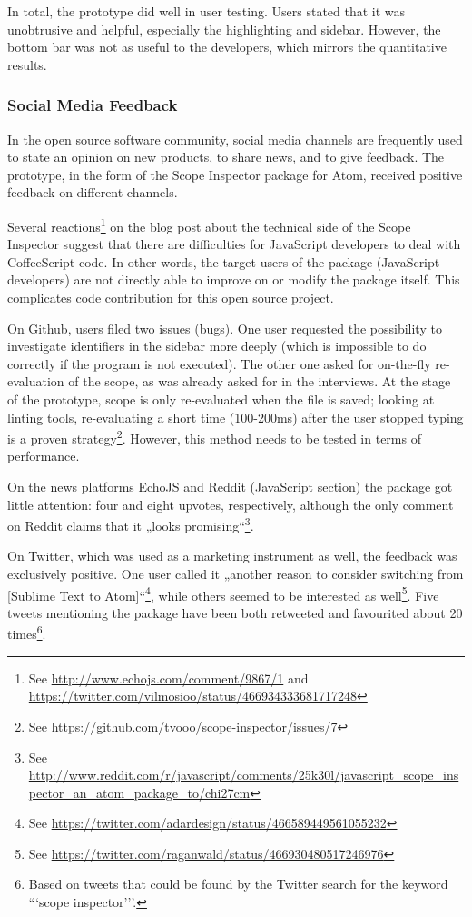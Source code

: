 In total, the prototype did well in user testing. Users stated that it
was unobtrusive and helpful, especially the highlighting and sidebar.
However, the bottom bar was not as useful to the developers, which
mirrors the quantitative results.

\subsubsection{Social Media Feedback}\label{social-media-feedback}

In the open source software community, social media channels are
frequently used to state an opinion on new products, to share news, and
to give feedback. The prototype, in the form of the Scope Inspector
package for Atom, received positive feedback on different channels.

Several
reactions\footnote{See \url{http://www.echojs.com/comment/9867/1} and \url{https://twitter.com/vilmosioo/status/466934333681717248}}
on the blog post about the technical side of the Scope Inspector
\cite{tvo} suggest that there are difficulties for JavaScript developers
to deal with CoffeeScript code. In other words, the target users of the
package (JavaScript developers) are not directly able to improve on or
modify the package itself. This complicates code contribution for this
open source project.

On Github, users filed two issues (bugs). One user requested the
possibility to investigate identifiers in the sidebar more deeply (which
is impossible to do correctly if the program is not executed). The other
one asked for on-the-fly re-evaluation of the scope, as was already
asked for in the interviews. At the stage of the prototype, scope is
only re-evaluated when the file is saved; looking at linting tools,
re-evaluating a short time (100-200ms) after the user stopped typing is
a proven
strategy\footnote{See \url{https://github.com/tvooo/scope-inspector/issues/7}}.
However, this method needs to be tested in terms of performance.

On the news platforms EchoJS and Reddit (JavaScript section) the package
got little attention: four and eight upvotes, respectively, although the
only comment on Reddit claims that it „looks
promising“\footnote{See \url{http://www.reddit.com/r/javascript/comments/25k30l/javascript_scope_inspector_an_atom_package_to/chi27cm}}.

On Twitter, which was used as a marketing instrument as well, the
feedback was exclusively positive. One user called it „another reason to
consider switching from {[}Sublime Text to
Atom{]}“\footnote{See \url{https://twitter.com/adardesign/status/466589449561055232}},
while others seemed to be interested as
well\footnote{See \url{https://twitter.com/raganwald/status/466930480517246976}}.
Five tweets mentioning the package have been both retweeted and
favourited about 20
times\footnote{Based on tweets that could be found by the Twitter search for the keyword ```scope inspector’’’.}.

